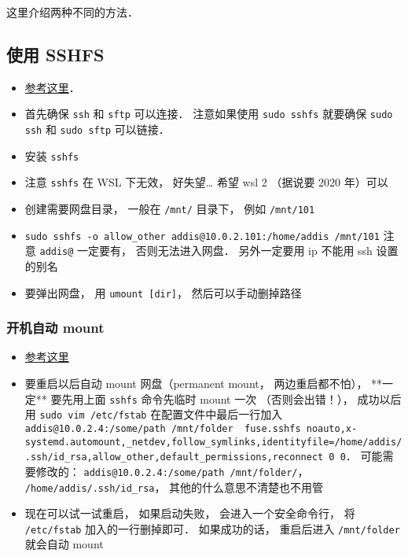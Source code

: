 
这里介绍两种不同的方法．

\subsection{使用 SSHFS}
\begin{itemize}
\item \href{https://www.digitalocean.com/community/tutorials/how-to-use-sshfs-to-mount-remote-file-systems-over-ssh}{参考这里}．
\item 首先确保 \verb`ssh` 和 \verb|sftp| 可以连接． 注意如果使用 \verb|sudo sshfs| 就要确保 \verb|sudo ssh| 和 \verb|sudo sftp| 可以链接．
\item 安装 \verb`sshfs`
\item 注意 \verb`sshfs` 在 WSL 下无效， 好失望… 希望 wsl 2 （据说要 2020 年）可以
\item 创建需要网盘目录， 一般在 \verb`/mnt/` 目录下， 例如 \verb`/mnt/101`
\item \verb`sudo sshfs -o allow_other addis@10.0.2.101:/home/addis /mnt/101` 注意 \verb`addis@` 一定要有， 否则无法进入网盘． 另外一定要用 ip 不能用 ssh 设置的别名
\item 要弹出网盘， 用 \verb`umount [dir]`， 然后可以手动删掉路径
\end{itemize}

\subsubsection{开机自动 mount}
\begin{itemize}
\item \href{https://www.linode.com/docs/networking/ssh/using-sshfs-on-linux/}{参考这里}
\item 要重启以后自动 mount 网盘（permanent mount， 两边重启都不怕）， **一定** 要先用上面 \verb`sshfs` 命令先临时 mount 一次 （否则会出错！）， 成功以后用 \verb`sudo vim /etc/fstab` 在配置文件中最后一行加入 \verb`addis@10.0.2.4:/some/path /mnt/folder  fuse.sshfs noauto,x-systemd.automount,_netdev,follow_symlinks,identityfile=/home/addis/.ssh/id_rsa,allow_other,default_permissions,reconnect 0 0`． 可能需要修改的： \verb`addis@10.0.2.4:/some/path /mnt/folder/`， \verb`/home/addis/.ssh/id_rsa`， 其他的什么意思不清楚也不用管
\item 现在可以试一试重启， 如果启动失败， 会进入一个安全命令行， 将 \verb`/etc/fstab` 加入的一行删掉即可． 如果成功的话， 重启后进入 \verb`/mnt/folder` 就会自动 mount
\end{itemize}

